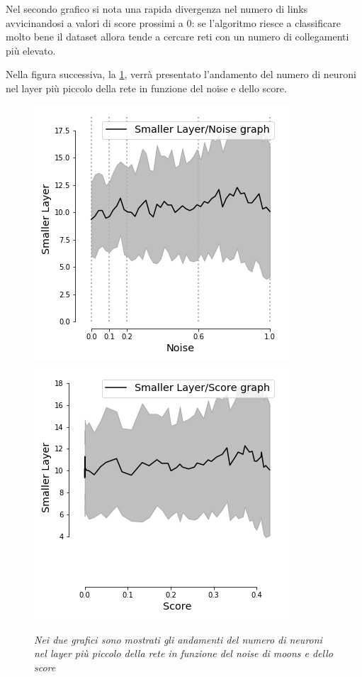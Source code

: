 \documentclass[12pt,a4paper]{report}
\begin{document}
Nel secondo grafico si nota una rapida divergenza nel numero di links avvicinandosi a valori di score  prossimi a 0: se l'algoritmo riesce a classificare molto bene il dataset allora tende a cercare reti con un numero di collegamenti più elevato.

Nella figura successiva, la \ref{smallmoons}, verrà presentato l'andamento del numero di neuroni nel layer più piccolo della rete in funzione del noise e dello score.

\begin{figure}[H]
 \centering
 \includegraphics[scale = 0.5]{images/small_noise_moons}
 \includegraphics[scale = 0.5]{images/small_Score_moons}
 \caption{\textit{Nei due grafici sono mostrati gli andamenti del numero di neuroni nel layer più piccolo della rete in funzione del noise di moons e dello score}}
 \label{smallmoons}
\end{figure}
\end{document}
